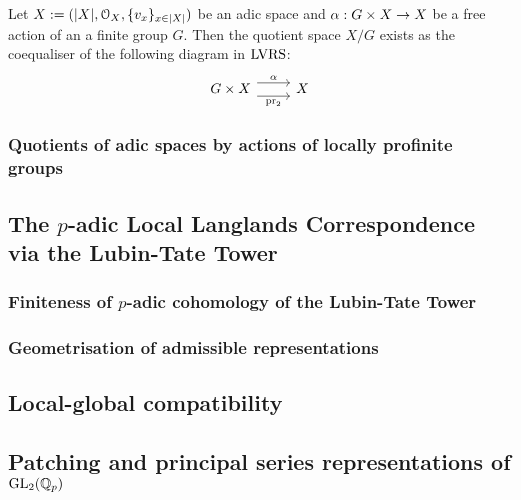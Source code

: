             \begin{corollary} \label{coro: quotients_of_adic_spaces_by_free_actions_of_finite_groups_are_coequalisers}
                Let $X := (|X|, \mathcal{O}_X, \{v_x\}_{x \in |X|})$ be an adic space and $\alpha: G \x X \to X$ be a free action of an a finite group $G$. Then the quotient space $X/G$ exists as the coequaliser of the following diagram in $\mathrm{LVRS}$:
                    $$
                        \begin{tikzcd}
                        	{G \x X} & X
                        	\arrow["{\pr_2}"', shift right=2, from=1-1, to=1-2]
                        	\arrow["\alpha", shift left=2, from=1-1, to=1-2]
                        \end{tikzcd}
                    $$
            \end{corollary}
    
        \subsubsection{Quotients of adic spaces by actions of locally profinite groups}
    
    \subsection{The \texorpdfstring{$p$}{}-adic Local Langlands Correspondence via the Lubin-Tate Tower}
        \subsubsection{Finiteness of \texorpdfstring{$p$}{}-adic cohomology of the Lubin-Tate Tower}
        
        \subsubsection{Geometrisation of admissible representations}
        
    \subsection{Local-global compatibility}
    
    \subsection{Patching and principal series representations of \texorpdfstring{$\operatorname{GL}_2(\mathbb{Q}_p)$}{}}